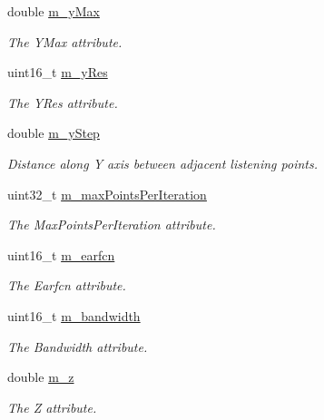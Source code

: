 \begin{DoxyCompactItemize}
double \hyperlink{classns3_1_1RadioEnvironmentMapHelper_af8f02bf194b74569fb9f6b843d44b2ca}{m\+\_\+y\+Max}
\begin{DoxyCompactList}\small\item\em The {\ttfamily Y\+Max} attribute. \end{DoxyCompactList}\item 
uint16\+\_\+t \hyperlink{classns3_1_1RadioEnvironmentMapHelper_a0d7e6c3089d6f70c1f6a5559162fbb7d}{m\+\_\+y\+Res}
\begin{DoxyCompactList}\small\item\em The {\ttfamily Y\+Res} attribute. \end{DoxyCompactList}\item 
double \hyperlink{classns3_1_1RadioEnvironmentMapHelper_ae8a3bb9ec904f4dd3c1f8326a2e23095}{m\+\_\+y\+Step}
\begin{DoxyCompactList}\small\item\em Distance along Y axis between adjacent listening points. \end{DoxyCompactList}\item 
uint32\+\_\+t \hyperlink{classns3_1_1RadioEnvironmentMapHelper_ab1dad1405a279b94c4c728c64c2b98cc}{m\+\_\+max\+Points\+Per\+Iteration}
\begin{DoxyCompactList}\small\item\em The {\ttfamily Max\+Points\+Per\+Iteration} attribute. \end{DoxyCompactList}\item 
uint16\+\_\+t \hyperlink{classns3_1_1RadioEnvironmentMapHelper_aa04a4e6e1f216f95e3074120101e9d95}{m\+\_\+earfcn}
\begin{DoxyCompactList}\small\item\em The {\ttfamily Earfcn} attribute. \end{DoxyCompactList}\item 
uint16\+\_\+t \hyperlink{classns3_1_1RadioEnvironmentMapHelper_ad93e4ceadf18b1eaf3a8399439ca6a25}{m\+\_\+bandwidth}
\begin{DoxyCompactList}\small\item\em The {\ttfamily Bandwidth} attribute. \end{DoxyCompactList}\item 
double \hyperlink{classns3_1_1RadioEnvironmentMapHelper_a4c45c1522f5ec57867cc16e38dc7dd9d}{m\+\_\+z}
\begin{DoxyCompactList}\small\item\em The {\ttfamily Z} attribute. \end{DoxyCompactList}\item 

\end{DoxyCompactItemize}
